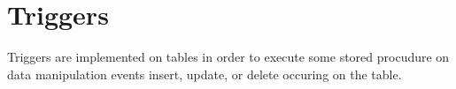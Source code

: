 \section{Triggers}\label{sec_triggers}

Triggers are implemented on tables in order to execute some stored procudure on data manipulation events insert, update, or delete occuring on the table.
% 
% 		
% 		

